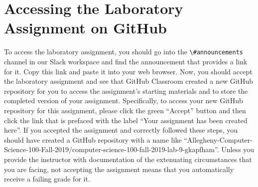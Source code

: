 \documentclass[11pt]{article}
\newcommand{\command}[1]{``\lstinline{#1}''}
\newcommand{\channel}[1]{\lstinline{#1}}
\begin{document}
\section*{Accessing the Laboratory Assignment on GitHub}

To access the laboratory assignment, you should go into the
\channel{\#announcements} channel in our Slack workspace and find the
announcement that provides a link for it. Copy this link and paste it into your
web browser. Now, you should accept the laboratory assignment and see that
GitHub Classroom created a new GitHub repository for you to access the
assignment's starting materials and to store the completed version of your
assignment. Specifically, to access your new GitHub repository for this
assignment, please click the green ``Accept'' button and then click the link
that is prefaced with the label ``Your assignment has been created here''. If
you accepted the assignment and correctly followed these steps, you should have
created a GitHub repository with a name like
``Allegheny-Computer-Science-100-Fall-2019/computer-science-100-fall-2019-lab-9-gkapfham''.
Unless you provide the instructor with documentation of the extenuating
circumstances that you are facing, not accepting the assignment means that you
automatically receive a failing grade for it.


\end{document}
